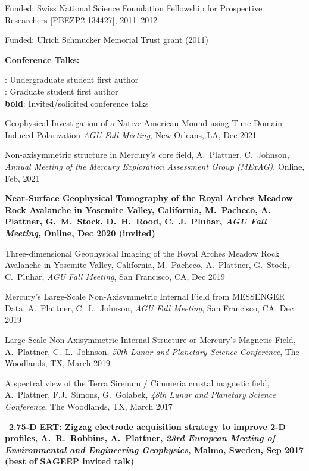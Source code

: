\documentclass[10pt]{article}
\begin{document}
\spcp Funded: Swiss National Science Foundation Fellowship for Prospective Researchers
[PBEZP2-134427], 2011--2012

\spcp
Funded: Ulrich Schmucker Memorial Trust grant (2011)

\spc

\textbf{\tsize Conference Talks:}

\spcp
\ug: Undergraduate student first author\\
\gr: Graduate student first author\\
\textbf{bold}: Invited/solicited conference talks

\spcp
Geophysical Investigation of a Native-American Mound using Time-Domain Induced Polarization \emph{AGU Fall Meeting}, New Orleans, LA, Dec 2021


\spcp
Non-axisymmetric structure in Mercury's core field, A.~Plattner, C.~Johnson, \emph{Annual Meeting of the Mercury Exploration Assessment Group (MExAG)}, Online, Feb, 2021

\spcp
\hspace{-0.4cm} \gr \hspace{-0.03cm} \textbf{Near-Surface Geophysical Tomography of the Royal Arches Meadow Rock Avalanche in Yosemite Valley, California, M.~Pacheco, A. Plattner, G.~M.~Stock, D.~H.~Rood, C.~J.~Pluhar, \emph{AGU Fall Meeting}, Online, Dec 2020 (invited)}

\spcp
\hspace{-0.4cm} \gr \hspace{-0.03cm} Three-dimensional Geophysical Imaging of the Royal Arches Meadow Rock Avalanche in Yosemite Valley, California, M.~Pacheco, A.~Plattner, G.~Stock, C.~Pluhar, \emph{AGU Fall Meeting}, San Francisco, CA, Dec 2019

\spcp
Mercury's Large-Scale Non-Axisymmetric Internal Field from MESSENGER Data, A.~Plattner, C.~L.~Johnson, \emph{AGU Fall Meeting}, San Francisco, CA, Dec 2019

\spcp
Large-Scale Non-Axisymmetric Internal Structure or Mercury's Magnetic Field,
A.~Plattner, C.~L.~Johnson, \emph{50th Lunar and Planetary Science Conference},
The Woodlands, TX, March 2019

\spcp
A spectral view of the Terra Sirenum / Cimmeria crustal magnetic field, A.~Plattner, F.J.~Simons, G.~Golabek, \emph{48th Lunar and Planetary Science Conference}, The Woodlands, TX, March 2017

\spcp 
\hspace{-0.4cm}\ug \, \textbf{2.75-D ERT: Zigzag electrode acquisition strategy
to improve 2-D profiles,
A.~R.~Robbins, A.~Plattner,
\emph{23rd European Meeting of Environmental and Engineering Geophysics}, Malmo, Sweden, Sep 2017 (best of SAGEEP invited talk)}
\end{document}
